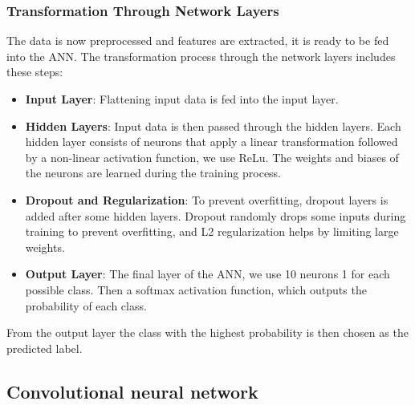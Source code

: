 \subsubsection{Transformation Through Network Layers}
The data is now preprocessed and features are extracted, it is ready to be fed into the ANN. The transformation process through the network layers includes these steps:
\begin{itemize}
    \item \textbf{Input Layer}: Flattening input data is fed into the input layer.
    \item \textbf{Hidden Layers}: Input data is then passed through the hidden layers. Each hidden layer consists of neurons that apply a linear transformation followed by a non-linear activation function, we use ReLu. The weights and biases of the neurons are learned during the training process.
    \item \textbf{Dropout and Regularization}: To prevent overfitting, dropout layers is added after some hidden layers. Dropout randomly drops some inputs during training to prevent overfitting, and L2 regularization helps by limiting large weights.
    \item \textbf{Output Layer}: The final layer of the ANN, we use 10 neurons 1 for each possible class. Then a softmax activation function, which outputs the probability of each class. 
\end{itemize}
From the output layer the class with the highest probability is then chosen as the predicted label.

\subsection{Convolutional neural network}

